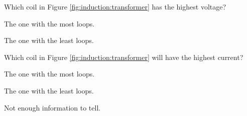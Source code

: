 \begin{checkpoint}{}
	\begin{MCquestion}{Which coil in Figure \ref{fig:induction:transformer} has the highest voltage?}
		\item The one with the most loops. \correct
		\item The one with the least loops.
	\end{MCquestion}
\end{checkpoint}

\begin{checkpoint}{}
	\begin{MCquestion}{Which coil in Figure \ref{fig:induction:transformer} will have the highest current?}
		\item The one with the most loops.
		\item The one with the least loops. \correct
		\item Not enough information to tell.
	\end{MCquestion}
\end{checkpoint}

